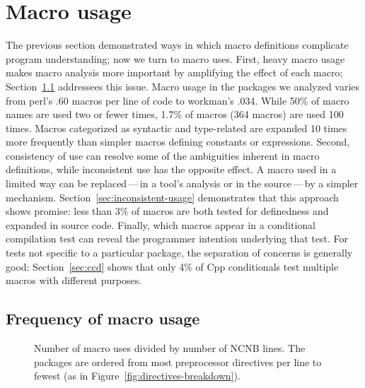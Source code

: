 \documentclass[10pt]{article}
\newcommand{\pkg}[1]{\textsf{#1}}
\newcommand{\captionsmall}[1]{\caption[]{\small #1}}
\begin{document}
\section{Macro usage}


The previous section demonstrated ways in which macro definitions
complicate program understanding; now we turn to macro uses.  First, heavy
macro usage makes macro analysis more important by amplifying the effect of
each macro; Section~\ref{sec:macro-usage} addressees this issue.  Macro
usage in the packages we analyzed varies from
\pkg{perl}'s .60 macros per line of code to \pkg{workman}'s .034.  While
50\% of macro names are used two or fewer times, 1.7\% of macros (364
macros) are used 100 times.  Macros categorized as syntactic and
type-related are expanded 10 times more frequently than simpler macros
defining constants or expressions.  Second, consistency of use can resolve
some of the ambiguities inherent in macro definitions, while inconsistent
use has the opposite effect.  A macro used in a limited way can be
replaced\,---\,in a tool's analysis or in the source\,---\,by a simpler
mechanism.  Section~\ref{sec:inconsistent-usage} demonstrates that this
approach shows promise:  less than 3\% of macros are both tested for
definedness and expanded in source code.  Finally, which macros appear in a
conditional compilation test can reveal the programmer intention underlying
that test.  For tests not specific to a particular package, the separation
of concerns is generally good:  Section~\ref{sec:ccd} shows that only 4\%
of Cpp conditionals test multiple macros with different purposes.


\subsection{Frequency of macro usage}
\label{sec:macro-usage}

\begin{figure}
\centerline{}
\captionsmall{Number of macro uses divided by number of NCNB lines.
  The packages are ordered from most preprocessor directives per line to
  fewest (as in Figure~\ref{fig:directives-breakdown}).}
\label{fig:use-per-line}
\end{figure}
\end{document}
